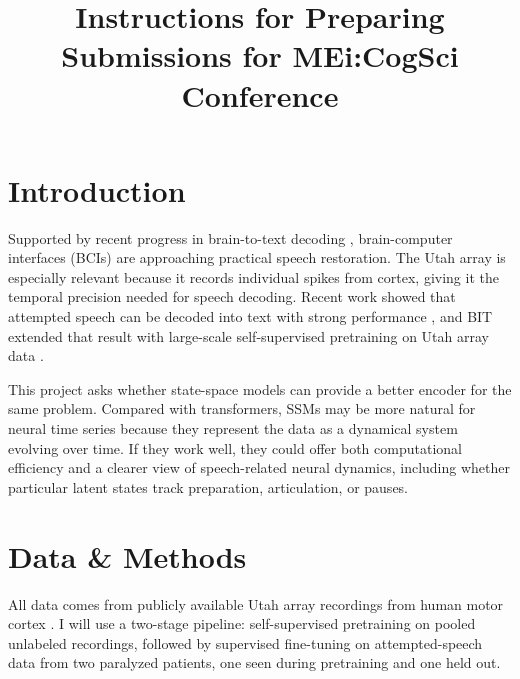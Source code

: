 \documentclass[twocolumn,letterpaper,10pt]{article}
\begin{document}
\date{}
\title{Instructions for Preparing Submissions for MEi:CogSci Conference}

\author{
\vspace{1ex}
}

\maketitle 

\thispagestyle{empty}


\section{Introduction}

Supported by recent progress in brain-to-text decoding \citep{willett2023,bit2026}, brain-computer interfaces (BCIs) are approaching practical speech restoration. The Utah array is especially relevant because it records individual spikes from cortex, giving it the temporal precision needed for speech decoding. Recent work showed that attempted speech can be decoded into text with strong performance \citep{willett2023}, and BIT extended that result with large-scale self-supervised pretraining on Utah array data \citep{bit2026}. 

This project asks whether state-space models can provide a better encoder for the same problem. Compared with transformers, SSMs may be more natural for neural time series because they represent the data as a dynamical system evolving over time. If they work well, they could offer both computational efficiency and a clearer view of speech-related neural dynamics, including whether particular latent states track preparation, articulation, or pauses. 

\section{Data \& Methods}


All data comes from publicly available Utah array recordings from human motor cortex \citep{willett2023}. I will use a two-stage pipeline: self-supervised pretraining on pooled unlabeled recordings, followed by supervised fine-tuning on attempted-speech data from two paralyzed patients, one seen during pretraining and one held out. 
\end{document}

